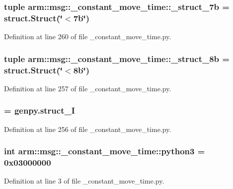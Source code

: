 \subsubsection[{\-\_\-struct\-\_\-7b}]{\setlength{\rightskip}{0pt plus 5cm}tuple {\bf arm\-::msg\-::\-\_\-constant\-\_\-move\-\_\-time\-::\-\_\-struct\-\_\-7b} = struct.\-Struct(\char`\"{}$<$7b\char`\"{})}\label{namespacearm_1_1msg_1_1__constant__move__time_a012f3449571788070b36e4f513e43274}


\-Definition at line 260 of file \-\_\-constant\-\_\-move\-\_\-time.\-py.

\subsubsection[{\-\_\-struct\-\_\-8b}]{\setlength{\rightskip}{0pt plus 5cm}tuple {\bf arm\-::msg\-::\-\_\-constant\-\_\-move\-\_\-time\-::\-\_\-struct\-\_\-8b} = struct.\-Struct(\char`\"{}$<$8b\char`\"{})}\label{namespacearm_1_1msg_1_1__constant__move__time_a422fe58dea7a2ae35f9e43ac322eb6d9}


\-Definition at line 257 of file \-\_\-constant\-\_\-move\-\_\-time.\-py.

\subsubsection[{\-\_\-struct\-\_\-\-I}]{ = genpy.\-struct\-\_\-\-I}\label{namespacearm_1_1msg_1_1__constant__move__time_a5b33e4b1b8f42aed45df0a41a01b906a}


\-Definition at line 256 of file \-\_\-constant\-\_\-move\-\_\-time.\-py.

\subsubsection[{python3}]{\setlength{\rightskip}{0pt plus 5cm}int {\bf arm\-::msg\-::\-\_\-constant\-\_\-move\-\_\-time\-::python3} = 0x03000000}\label{namespacearm_1_1msg_1_1__constant__move__time_aa70ba11ee7db4d61e504659592b93141}


\-Definition at line 3 of file \-\_\-constant\-\_\-move\-\_\-time.\-py.

